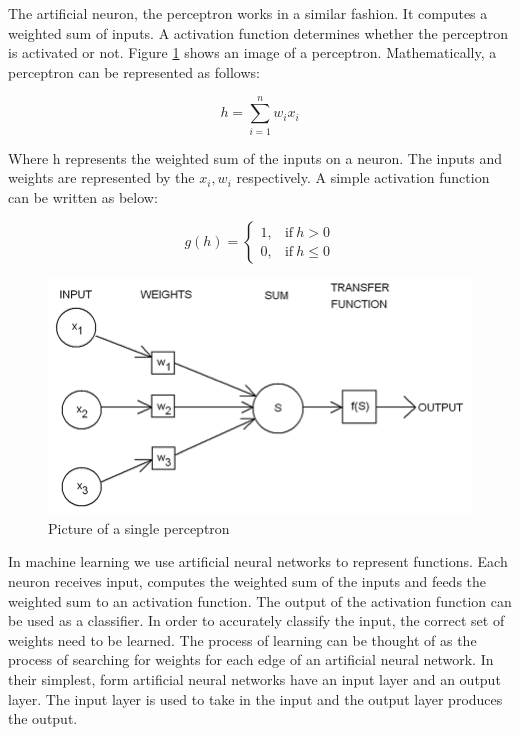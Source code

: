 \documentclass[a4paper,11pt]{article}
\begin{document}
 The artificial neuron, the perceptron works in a similar fashion. It computes a weighted sum of inputs. A activation function determines whether the perceptron is activated or not.  Figure \ref{fig: perceptron} shows an image of a perceptron. Mathematically, a perceptron can be represented as follows:
 
 \begin{equation}
  h = \sum_{i=1}^{n} w_ix_i
 \end{equation}

Where h represents the weighted sum of the inputs on a neuron. 
 The inputs and weights are represented by the $x_i, w_i$ respectively. A simple activation function can be written as below:
 
 \begin{equation}
    g(h)=
    \begin{cases}
      1, & \text{if}\ h > 0 \\
      0, & \text{if}\  h \le 0
    \end{cases}
  \end{equation}

\begin{figure}[!htbp]
\includegraphics[scale=0.5]{Perceptron_1.png}  
\caption{Picture of a single perceptron \citep{Alves} }
\label{fig: perceptron}
\end{figure}
 
In machine learning we use artificial neural networks to represent functions. Each neuron receives input, computes the weighted sum of the inputs and feeds the weighted sum to an activation function. The output of the activation function can be used as a classifier. In order to accurately classify the input, the correct set of weights need to be learned. The process of learning can be thought of as the process of searching for weights for each edge of an artificial neural network. In their simplest, form artificial neural networks have an input layer and an output layer. The input layer is used to take in the input and the output layer produces the output. 
\end{document}
